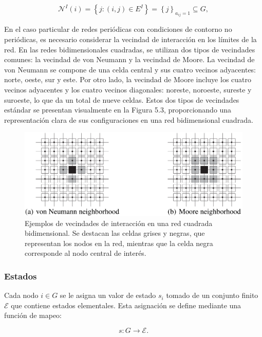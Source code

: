 \begin{equation}\label{eq:43}
	\mathcal{N}^I(i) = \left\{j:(i,j)\in E^I\right\}=\left\{j\right\}_{a_{ij}=1}\subseteq G,
\end{equation}

En el caso particular de redes periódicas con condiciones de contorno no periódicas, es necesario considerar la vecindad de interacción en los límites de la red. En las redes bidimensionales cuadradas, se utilizan dos tipos de vecindades comunes: la vecindad de von Neumann y la vecindad de Moore. La vecindad de von Neumann se compone de una celda central y sus cuatro vecinos adyacentes: norte, oeste, sur y este. Por otro lado, la vecindad de Moore incluye los cuatro vecinos adyacentes y los cuatro vecinos diagonales: noreste, noroeste, sureste y suroeste, lo que da un total de nueve celdas.  Estos dos tipos de vecindades estándar se presentan visualmente en la Figura 5.3, proporcionando una representación clara de sus configuraciones en una red bidimensional cuadrada.


\begin{figure}[ht]
	\centering\includegraphics[width=\imsize]{celdas}
	\caption[Ejemplos de vecindades de interacción en una red cuadrada bidimensional. ]{Ejemplos de vecindades de interacción en una red cuadrada bidimensional. Se destacan las celdas grises y negras, que representan los nodos en la red, mientras que la celda negra corresponde al nodo central de interés.} 	\label{fig:celdas}
\end{figure}


\subsubsection{Estados}


Cada nodo $i\in G$ se le asigna un valor de estado $s_i$ tomado de un conjunto finito $\mathcal{E}$ que contiene estados elementales. Esta asignación se define mediante una función de mapeo:

\begin{equation}
	s:G\rightarrow\mathcal{E}.
\end{equation}

